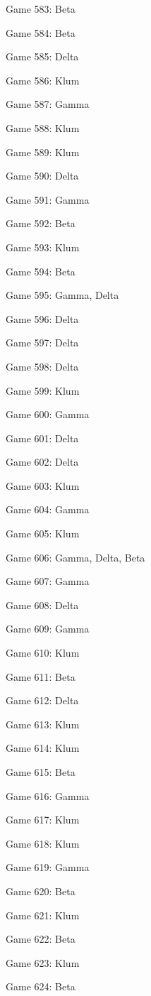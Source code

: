 \documentclass{article}
\begin{document}
\begin{multicols}{3}
\begin{compactitem}
\item Game 583:
Beta
\item Game 584:
Beta
\item Game 585:
Delta
\item Game 586:
Klum
\item Game 587:
Gamma
\item Game 588:
Klum
\item Game 589:
Klum
\item Game 590:
Delta
\item Game 591:
Gamma
\item Game 592:
Beta
\item Game 593:
Klum
\item Game 594:
Beta
\item Game 595:
Gamma, Delta
\item Game 596:
Delta
\item Game 597:
Delta
\item Game 598:
Delta
\item Game 599:
Klum
\item Game 600:
Gamma
\item Game 601:
Delta
\item Game 602:
Delta
\item Game 603:
Klum
\item Game 604:
Gamma
\item Game 605:
Klum
\item Game 606:
Gamma, Delta, Beta
\item Game 607:
Gamma
\item Game 608:
Delta
\item Game 609:
Gamma
\item Game 610:
Klum
\item Game 611:
Beta
\item Game 612:
Delta
\item Game 613:
Klum
\item Game 614:
Klum
\item Game 615:
Beta
\item Game 616:
Gamma
\item Game 617:
Klum
\item Game 618:
Klum
\item Game 619:
Gamma
\item Game 620:
Beta
\item Game 621:
Klum
\item Game 622:
Beta
\item Game 623:
Klum
\item Game 624:
Beta

\end{compactitem}
\end{multicols}
\end{document}
